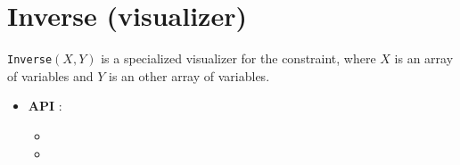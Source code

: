 \section{Inverse (visualizer)}\label{inverse:visu}\hypertarget{inverse:visu}{}
\begin{notedef}
  \texttt{Inverse}$(X, Y)$ is a specialized visualizer for the  constraint, where $X$ is an array of variables and $Y$ is an other array of variables.
\end{notedef}

\begin{itemize}
	\item \textbf{API} : 
	\begin{itemize}
	\item {}
	\item {}
	\end{itemize}
\end{itemize}

%

